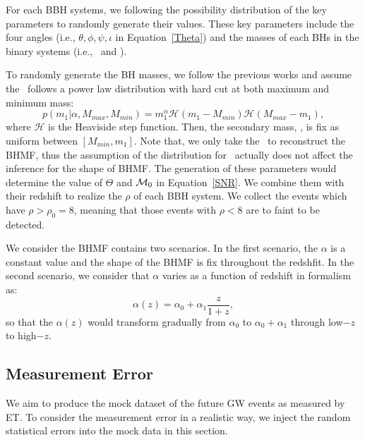 \documentclass[twocolumn]{aastex62}
\begin{document}
For each BBH systems, we following the possibility distribution of the key parameters to randomly generate their values. These key parameters include the four angles (i.e., $\theta, \phi, \psi, \iota$ in Equation~\ref{Theta}) and the masses of each BHs in the binary systems (i.e., \mone\ and \mtwo).

To randomly generate the BH masses, we follow the previous works \citep{Kovetz2017PhRvD, Abbott2018b, Fishbach2018} and assume the \mone\ follows a power law distribution with hard cut at both maximum and minimum mass:
 \begin{equation} \label{equ_powlaw}
p(m_1|\alpha, M_{max}, M_{min}) = m_1^{\alpha} \mathcal{H}(m_1-M_{min}) \mathcal{H}(M_{max}-m_1),
 \end{equation}
where $\mathcal{H}$ is the Heaviside step function. Then, the secondary mass, \mtwo, is fix as uniform between $[M_{min}, m_1]$. Note that, we only take the \mone\ to reconstruct the BHMF, thus the assumption of the distribution for \mtwo\ actually does not affect the inference for the shape of BHMF.
The generation of these parameters would determine the value of $\Theta$ and ${\cal M}_0$ in Equation~\ref{SNR}. We combine them with their redshift to realize the $\rho$ of each BBH system. We collect the events which have $\rho > \rho_0 = 8$, meaning that those events with $\rho < 8$ are to faint to be detected. 

We consider the BHMF contains two scenarios. In the first scenario, the $\alpha$ is a constant value and the shape of the BHMF is fix throughout the redshfit. In the second scenario, we consider that $\alpha$ varies as a function of redshift in formalism as:
 \begin{equation} \label{equ_alphaz}
\alpha(z) = \alpha_0 + \alpha_1\frac{z}{1+z} , 
 \end{equation}
so that the $\alpha(z)$ would transform gradually from $\alpha_0$ to $\alpha_0+\alpha_1$ through low$-z$ to high$-z$.

\subsection{Measurement Error} \label{sec_noiselevel}
We aim to produce the mock dataset of the future GW events as measured by ET. To consider the measurement error in a realistic way, we inject the random statistical errors into the mock data in this section.
\end{document}
